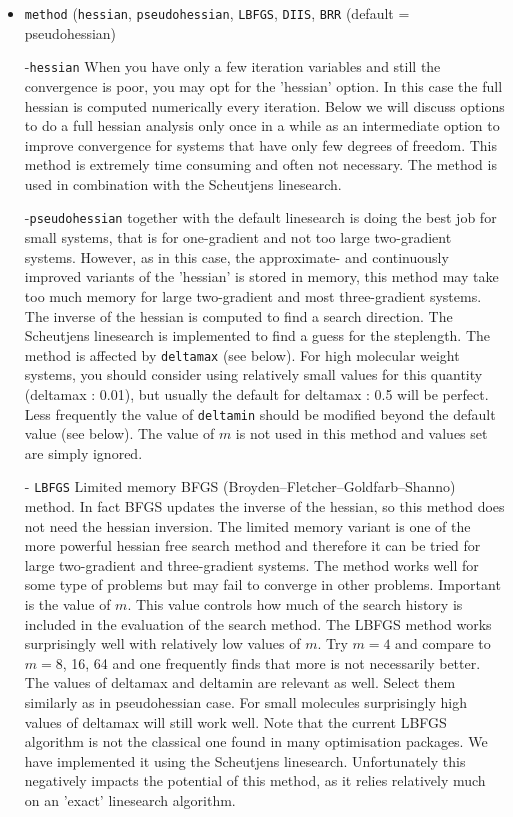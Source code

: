 \documentclass{article}
\begin{document}
\begin{itemize}
\item{\tt method} ({\tt hessian}, {\tt pseudohessian}, {\tt LBFGS}, {\tt DIIS}, {\tt BRR} (default = pseudohessian) 

-{\tt hessian} When you have only a few iteration variables and still the convergence is poor, you may opt for the 'hessian' option. In this case the full hessian is computed numerically every iteration. Below we will discuss options to do a full hessian analysis only once in a while as an intermediate option to improve convergence for systems that have only few degrees of freedom. This method is extremely time consuming and often not necessary. The method is used in combination with the Scheutjens linesearch. 

-{\tt pseudohessian} together with the default linesearch is doing the best job for small systems, that is for one-gradient and not too large two-gradient systems. However, as in this case, the approximate- and continuously improved variants of the 'hessian' is stored in memory, this method may take too much memory for large two-gradient and most three-gradient systems. The inverse of the hessian is computed to find a search direction. The Scheutjens linesearch is implemented to find a guess for the steplength.  The method is affected by {\tt deltamax} (see below). For high molecular weight systems, you should consider using relatively small values for this quantity (deltamax : 0.01), but usually the default for deltamax : 0.5 will be perfect. Less frequently the value of {\tt deltamin} should be modified beyond the default value (see below). The value of $m$ is not used in this method and values set are simply ignored.    

- {\tt LBFGS} Limited memory BFGS (Broyden–Fletcher–Goldfarb–Shanno) method. In fact BFGS updates the inverse of the hessian, so this method does not need the hessian inversion. The limited memory variant is one of the more powerful hessian free search method and therefore it can be tried for large two-gradient and three-gradient systems. The method works well for some type of problems but may fail to converge in other problems. Important is the value of $m$. This value controls how much of the search history is included in the evaluation of the search method. The LBFGS method works surprisingly well with relatively low values of $m$. Try $m=4$ and compare to $m=8$, 16, 64 and one frequently finds that more is not necessarily better. The values of deltamax and deltamin are relevant as well. Select them similarly as in pseudohessian case. For small molecules surprisingly high values of deltamax will still work well. Note that the current LBFGS algorithm is not the classical one found in many optimisation packages. We have implemented it using the Scheutjens linesearch. Unfortunately this negatively impacts the potential of this method, as it relies relatively much on an 'exact' linesearch algorithm.  


\end{itemize}
\end{document}

